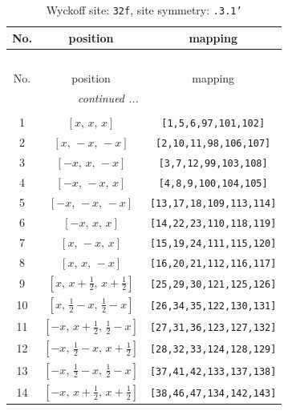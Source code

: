 \documentclass[fleqn,8pt]{jsarticle}
\begin{document}
\begin{longtable}{ccc}
\caption{Wyckoff site: {\tt 32f}, site symmetry: {\tt .3.1'}}
 \\
 \hline \hline
No. & position & mapping \\ \hline \endfirsthead

\multicolumn{2}{l}{\tablename\ \thetable{}} \\
 \hline \hline
No. & position & mapping \\ \hline \endhead

 \hline \hline
\multicolumn{2}{r}{\footnotesize\it continued ...} \\ \endfoot

 \hline \hline
\multicolumn{2}{r}{} \\ \endlastfoot

1 & $\left[ x,\, x,\, x \right]$ & {\tt [1,5,6,97,101,102]} \\ \hline
2 & $\left[ x,\, - x,\, - x \right]$ & {\tt [2,10,11,98,106,107]} \\ \hline
3 & $\left[ - x,\, x,\, - x \right]$ & {\tt [3,7,12,99,103,108]} \\ \hline
4 & $\left[ - x,\, - x,\, x \right]$ & {\tt [4,8,9,100,104,105]} \\ \hline
5 & $\left[ - x,\, - x,\, - x \right]$ & {\tt [13,17,18,109,113,114]} \\ \hline
6 & $\left[ - x,\, x,\, x \right]$ & {\tt [14,22,23,110,118,119]} \\ \hline
7 & $\left[ x,\, - x,\, x \right]$ & {\tt [15,19,24,111,115,120]} \\ \hline
8 & $\left[ x,\, x,\, - x \right]$ & {\tt [16,20,21,112,116,117]} \\ \hline
9 & $\left[ x,\, x + \frac{1}{2},\, x + \frac{1}{2} \right]$ & {\tt [25,29,30,121,125,126]} \\ \hline
10 & $\left[ x,\, \frac{1}{2} - x,\, \frac{1}{2} - x \right]$ & {\tt [26,34,35,122,130,131]} \\ \hline
11 & $\left[ - x,\, x + \frac{1}{2},\, \frac{1}{2} - x \right]$ & {\tt [27,31,36,123,127,132]} \\ \hline
12 & $\left[ - x,\, \frac{1}{2} - x,\, x + \frac{1}{2} \right]$ & {\tt [28,32,33,124,128,129]} \\ \hline
13 & $\left[ - x,\, \frac{1}{2} - x,\, \frac{1}{2} - x \right]$ & {\tt [37,41,42,133,137,138]} \\ \hline
14 & $\left[ - x,\, x + \frac{1}{2},\, x + \frac{1}{2} \right]$ & {\tt [38,46,47,134,142,143]} \\ \hline

\end{longtable}
\end{document}
